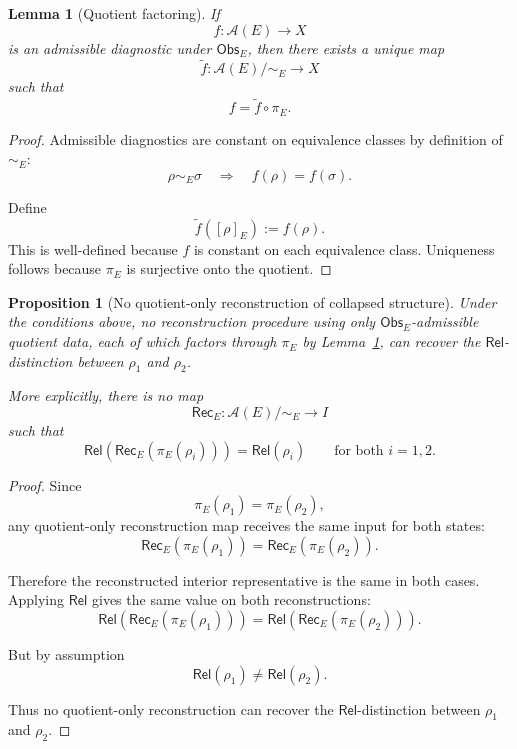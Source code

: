 \documentclass[aps,prx,onecolumn,11pt]{revtex4-2}
\theoremstyle{plain}
\newtheorem{lemma}{Lemma}
\newtheorem{proposition}{Proposition}
\theoremstyle{definition}
\theoremstyle{remark}
\begin{document}
\begin{lemma}[Quotient factoring]
\label{lem:quotient_factoring}
If
\[
f:\mathcal A(E)\to X
\]
is an admissible diagnostic under \(\mathsf{Obs}_E\), then there exists
a unique map
\[
\widetilde f:\mathcal A(E)/{\sim_E}\to X
\]
such that
\[
f=\widetilde f\circ\pi_E.
\]
\end{lemma}

\begin{proof}
Admissible diagnostics are constant on equivalence classes by definition
of \(\sim_E\):
\[
\rho\sim_E\sigma
\quad\Longrightarrow\quad
f(\rho)=f(\sigma).
\]

Define
\[
\widetilde f([\rho]_E):=f(\rho).
\]
This is well-defined because \(f\) is constant on each equivalence
class. Uniqueness follows because \(\pi_E\) is surjective onto the
quotient.
\end{proof}

\begin{proposition}[No quotient-only reconstruction of collapsed structure]
\label{prop:no_rec_from_quotient}
Under the conditions above, no reconstruction procedure using only
\(\mathsf{Obs}_E\)-admissible quotient data, each of which factors
through \(\pi_E\) by Lemma~\ref{lem:quotient_factoring}, can recover
the \(\mathsf{Rel}\)-distinction between \(\rho_1\) and \(\rho_2\).

More explicitly, there is no map
\[
\mathsf{Rec}_E:\mathcal A(E)/{\sim_E}\to I
\]
such that
\[
\mathsf{Rel}\!\left(\mathsf{Rec}_E(\pi_E(\rho_i))\right)
=
\mathsf{Rel}(\rho_i)
\qquad
\text{for both }i=1,2.
\]
\end{proposition}

\begin{proof}
Since
\[
\pi_E(\rho_1)=\pi_E(\rho_2),
\]
any quotient-only reconstruction map receives the same input for both
states:
\[
\mathsf{Rec}_E(\pi_E(\rho_1))
=
\mathsf{Rec}_E(\pi_E(\rho_2)).
\]

Therefore the reconstructed interior representative is the same in both
cases. Applying \(\mathsf{Rel}\) gives the same value on both
reconstructions:
\[
\mathsf{Rel}\!\left(\mathsf{Rec}_E(\pi_E(\rho_1))\right)
=
\mathsf{Rel}\!\left(\mathsf{Rec}_E(\pi_E(\rho_2))\right).
\]

But by assumption
\[
\mathsf{Rel}(\rho_1)\neq\mathsf{Rel}(\rho_2).
\]

Thus no quotient-only reconstruction can recover the
\(\mathsf{Rel}\)-distinction between \(\rho_1\) and \(\rho_2\).
\end{proof}
\end{document}
